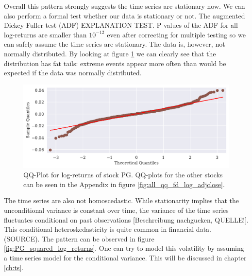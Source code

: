 \begin{table}[h!]
    \centering
    \begin{adjustbox}{width = 0.95\linewidth}
    
    \end{adjustbox}
    \caption{}
    \label{tab:log return means}
\end{table}{}

Overall this pattern strongly suggests the time series are stationary now. We can also perform a formal test whether our data is stationary or not. The augmented Dickey-Fuller test (ADF) EXPLANATION TEST. P-values of the ADF for all log-returns are smaller than $10^{-12}$ even after correcting for multiple testing so we can safely assume the time series are stationary. The data is, however, not normally distributed. By looking at figure \ref{fig:PG_qq_fd_log_adjclose} we can clearly see that the distribution has fat tails: extreme events appear more often than would be expected if the data was normally distributed. 

\begin{figure}[h!]
    \centering
    \begin{adjustbox}{width=.9\textwidth,center}
    \includegraphics[]{figures/PG_log_adjclose_fd_and_qq.pdf}
    \end{adjustbox}  
    \caption{QQ-Plot for log-returns of stock PG. QQ-plots for the other stocks can be seen in the Appendix in figure \ref{fig:all_qq_fd_log_adjclose}.}
    \label{fig:PG_qq_fd_log_adjclose}
\end{figure}{}

The time series are also not homoscedastic. While stationarity implies that the unconditional variance is constant over time, the variance of the time series fluctuates conditional on past observations [Beschreibung nachgucken, QUELLE!]. This conditional heteroskedasticity is quite common in financial data. (SOURCE). The pattern can be observed in figure \ref{fig:PG_squared_log_returns}. One can try to model this volatility by assuming a time series model for the conditional variance. This will be discussed in chapter \ref{ch:ts}. %


